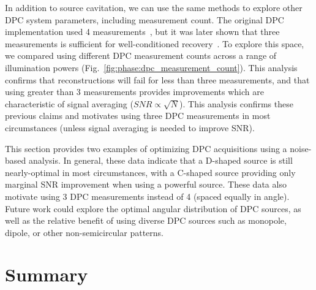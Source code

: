 In addition to source cavitation, we can use the same methods to explore other DPC system parameters, including measurement count. The original DPC implementation used 4 measurements~\cite{tian2015quantitative}, but it was later shown that three measurements is sufficient for well-conditioned recovery~\cite{PhillipsChen17cDPC}. To explore this space, we compared using different DPC measurement counts across a range of illumination powers (Fig.~\ref{fig:phase:dpc_measurement_count}). This analysis confirms that reconstructions will fail for less than three measurements, and that using greater than 3 measurements provides improvements which are characteristic of signal averaging ($SNR \propto \sqrt{N}$). This analysis confirms these previous claims and motivates using three DPC measurements in most circumstances (unless signal averaging is needed to improve SNR).

This section provides two examples of optimizing DPC acquisitions using a noise-based analysis. In general, these data indicate that a D-shaped source is still nearly-optimal in most circumstances, with a C-shaped source providing only marginal SNR improvement when using a powerful source. These data also motivate using 3 DPC measurements instead of 4 (spaced equally in angle). Future work could explore the optimal angular distribution of DPC sources, as well as the relative benefit of using diverse DPC sources such as monopole, dipole, or other non-semicircular patterns.

\section{Summary}


